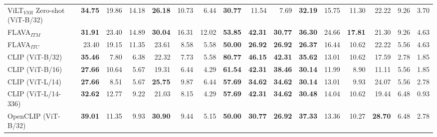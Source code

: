 \begin{table}[ht]
\begin{adjustbox}{max width=\textwidth}
\begin{tabular}{l|rrr|rrr|rrr|rrr|rrr}
 ViLT$_{VSR}$ Zero-shot (ViT-B/32)   & \textbf{34.75} & 19.86          & 14.18          & \textbf{26.18} & 10.73          & 6.44           & \textbf{30.77} & 11.54          & 7.69           & \textbf{32.19} & 15.75          & 11.30          & 22.22          & 9.26           & 3.70           \\
 FLAVA$_{ITM}$                       & \textbf{31.91} & 23.40          & 14.89          & \textbf{30.04} & 16.31          & 12.02          & \textbf{53.85} & \textbf{42.31} & \textbf{30.77} & \textbf{36.30} & 24.66          & \textbf{17.81} & 21.30          & 9.26           & 4.63           \\
 FLAVA$_{ITC}$                       & 23.40          & 19.15          & 11.35          & 23.61          & 8.58           & 5.58           & \textbf{50.00} & \textbf{26.92} & \textbf{26.92} & \textbf{26.37} & 16.44          & 10.62          & 22.22          & 5.56           & 4.63           \\
 CLIP (ViT-B/32)                     & \textbf{35.46} & 7.80           & 6.38           & 22.32          & 7.73           & 5.58           & \textbf{80.77} & \textbf{46.15} & \textbf{42.31} & \textbf{35.62} & 13.01          & 10.62          & 17.59          & 2.78           & 1.85           \\
 CLIP (ViT-B/16)                     & \textbf{27.66} & 10.64          & 5.67           & 19.31          & 6.44           & 4.29           & \textbf{61.54} & \textbf{42.31} & \textbf{38.46} & \textbf{30.14} & 11.99          & 8.90           & 11.11          & 5.56           & 1.85           \\
 CLIP (ViT-L/14)                     & \textbf{27.66} & 8.51           & 5.67           & \textbf{25.75} & 9.87           & 6.44           & \textbf{57.69} & \textbf{34.62} & \textbf{34.62} & \textbf{30.14} & 13.01          & 9.93           & 24.07          & 5.56           & 2.78           \\
 CLIP (ViT-L/14-336)                 & \textbf{32.62} & 12.77          & 9.22           & 21.03          & 8.15           & 4.29           & \textbf{57.69} & \textbf{42.31} & \textbf{34.62} & \textbf{30.48} & 14.04          & 10.62          & 19.44          & 6.48           & 0.93           \\
 OpenCLIP (ViT-B/32)            & \textbf{39.01} & 11.35          & 9.93           & \textbf{30.90} & 9.44           & 5.15           & \textbf{50.00} & \textbf{30.77} & \textbf{26.92} & \textbf{37.33} & 13.36          & 10.27          & \textbf{28.70} & 6.48           & 2.78           \\

\end{tabular}
\end{adjustbox}
\end{table}
